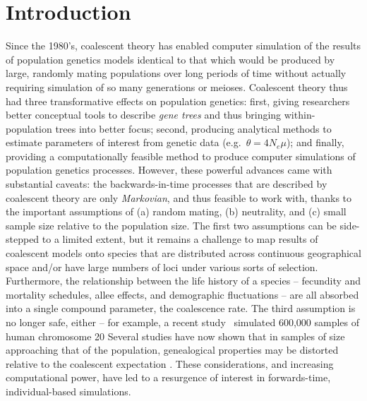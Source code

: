 \documentclass{article}
\begin{document}
\section*{Introduction}

Since the 1980's, coalescent theory has enabled computer simulation of the results of population genetics models
identical to that which would be produced by large, randomly mating populations over long periods of time
without actually requiring simulation of so many generations or meioses.
Coalescent theory thus had three transformative effects on population genetics:
first, giving researchers better conceptual tools to describe \emph{gene trees} and thus bringing within-population trees into better focus;
second, producing analytical methods to estimate parameters of interest from genetic data (e.g.\ $\theta = 4N_e \mu$);
and finally, providing a computationally feasible method to produce computer simulations of population genetics processes.
However, these powerful advances came with substantial caveats:
the backwards-in-time processes that are described by coalescent theory
are only \emph{Markovian}, and thus feasible to work with,
thanks to the important assumptions of 
(a) random mating, 
(b) neutrality,
and (c) small sample size relative to the population size.
The first two assumptions can be side-stepped to a limited extent, 
but it remains a challenge to map results of coalescent models
onto species that are distributed across continuous geographical space 
and/or have large numbers of loci under various sorts of selection.
Furthermore, the relationship between the life history of a species --
fecundity and mortality schedules, allee effects, and demographic fluctuations --
are all absorbed into a single compound parameter, the coalescence rate.
The third assumption is no longer safe, either --
for example, a recent study~\citep{martin2017human}
simulated 600,000 samples of human chromosome 20
Several studies have now shown that in samples of size approaching that of the population,
genealogical properties may be distorted relative to the coalescent expectation
\citep{wakeley2003gene,maruvka2011recovering,bhaskar2014distortion}.
These considerations, and increasing computational power, have led to a resurgence of interest in forwards-time, individual-based simulations.
\end{document}
